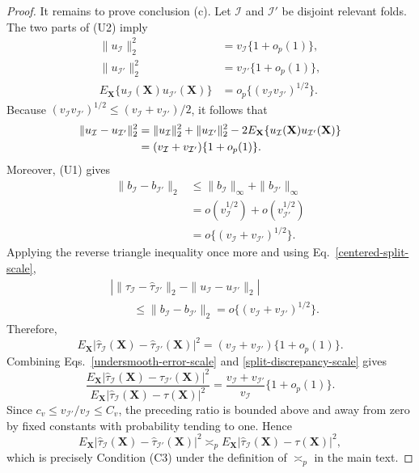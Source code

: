 \documentclass[11pt]{article}
\theoremstyle{referenceplain}
\theoremstyle{referencedefinition}
\theoremstyle{referenceremark}
\begin{document}
\begin{proof}
It remains to prove conclusion (c). Let $\mathcal I$ and $\mathcal I'$ be
disjoint relevant folds. The two parts of (U2) imply
\begin{align*}
\|u_{\mathcal I}\|_2^2
&=v_{\mathcal I}\{1+o_p(1)\},\\
\|u_{\mathcal I'}\|_2^2
&=v_{\mathcal I'}\{1+o_p(1)\},\\
E_{\mathbf X}
\{u_{\mathcal I}(\mathbf X)u_{\mathcal I'}(\mathbf X)\}
&=o_p\{(v_{\mathcal I}v_{\mathcal I'})^{1/2}\}.
\end{align*}
Because
$(v_{\mathcal I}v_{\mathcal I'})^{1/2}
\le (v_{\mathcal I}+v_{\mathcal I'})/2$, it follows that
\begin{align}
\|u_{\mathcal I}-u_{\mathcal I'}\|_2^2
&=\|u_{\mathcal I}\|_2^2
+\|u_{\mathcal I'}\|_2^2
-2E_{\mathbf X}
\{u_{\mathcal I}(\mathbf X)u_{\mathcal I'}(\mathbf X)\}
\notag\\
&=(v_{\mathcal I}+v_{\mathcal I'})\{1+o_p(1)\}.
\label{centered-split-scale}
\end{align}
Moreover, (U1) gives
\begin{align*}
\|b_{\mathcal I}-b_{\mathcal I'}\|_2
&\le
\|b_{\mathcal I}\|_\infty
+\|b_{\mathcal I'}\|_\infty\\
&=o(v_{\mathcal I}^{1/2})
+o(v_{\mathcal I'}^{1/2})\\
&=o\{(v_{\mathcal I}+v_{\mathcal I'})^{1/2}\}.
\end{align*}
Applying the reverse triangle inequality once more and using
Eq.~\eqref{centered-split-scale},
\begin{align*}
&\left|
\|\widehat\tau_{\mathcal I}-\widehat\tau_{\mathcal I'}\|_2
-\|u_{\mathcal I}-u_{\mathcal I'}\|_2
\right|\\
&\qquad\le
\|b_{\mathcal I}-b_{\mathcal I'}\|_2
=o\{(v_{\mathcal I}+v_{\mathcal I'})^{1/2}\}.
\end{align*}
Therefore,
\begin{equation}\label{split-discrepancy-scale}
E_{\mathbf X}
|\widehat\tau_{\mathcal I}(\mathbf X)
-\widehat\tau_{\mathcal I'}(\mathbf X)|^2
=(v_{\mathcal I}+v_{\mathcal I'})\{1+o_p(1)\}.
\end{equation}
Combining Eqs.~\eqref{undersmooth-error-scale} and
\eqref{split-discrepancy-scale} gives
\[
\frac{
E_{\mathbf X}
|\widehat\tau_{\mathcal I}(\mathbf X)
-\widehat\tau_{\mathcal I'}(\mathbf X)|^2
}{
E_{\mathbf X}
|\widehat\tau_{\mathcal I}(\mathbf X)-\tau(\mathbf X)|^2
}
=
\frac{v_{\mathcal I}+v_{\mathcal I'}}{v_{\mathcal I}}
\{1+o_p(1)\}.
\]
Since
$c_v\le v_{\mathcal I'}/v_{\mathcal I}\le C_v$, the preceding ratio is
bounded above and away from zero by fixed constants with probability
tending to one. Hence
\[
E_{\mathbf X}
|\widehat\tau_{\mathcal I}(\mathbf X)
-\widehat\tau_{\mathcal I'}(\mathbf X)|^2
\asymp_p
E_{\mathbf X}
|\widehat\tau_{\mathcal I}(\mathbf X)-\tau(\mathbf X)|^2,
\]
which is precisely Condition (C3) under the definition of $\asymp_p$ in
the main text.
\end{proof}
\end{document}
